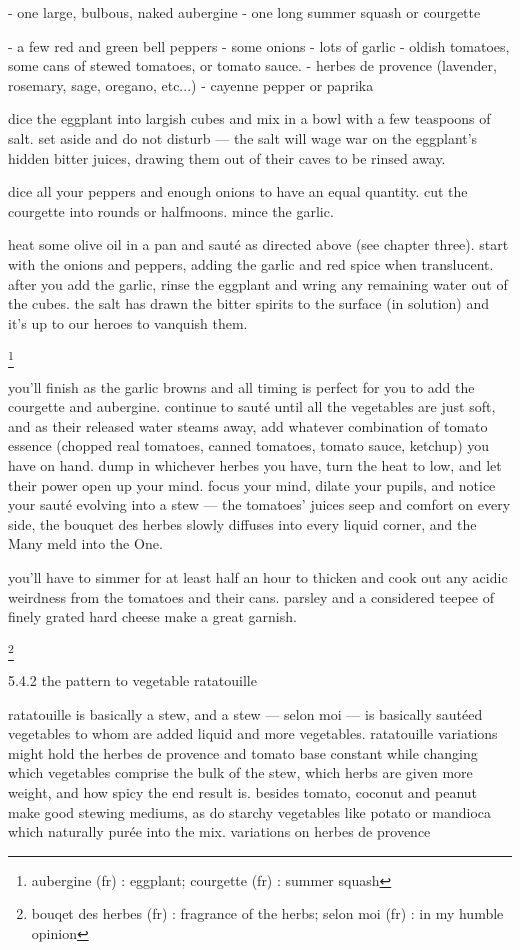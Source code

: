 -	one large, bulbous, naked aubergine
-	one long summer squash or courgette

-	a few red and green bell peppers
-	some onions
-	lots of garlic
-	oldish tomatoes, some cans of stewed tomatoes, or tomato sauce.
-	herbes de provence (lavender, rosemary, sage, oregano, etc...)
-	cayenne pepper or paprika

dice the eggplant into largish cubes and mix in a bowl with a few teaspoons of salt. set aside and do not disturb --- the salt will wage war on the eggplant's hidden bitter juices, drawing them out of their caves to be rinsed away.

dice all your peppers and enough onions to have an equal quantity. cut the courgette into rounds or halfmoons. mince the garlic.

heat some olive oil in a pan and saut\'{e} as directed above (see chapter three). start with the onions and peppers, adding the garlic and red spice when translucent. after you add the garlic, rinse the eggplant and wring any remaining water out of the cubes. the salt has drawn the bitter spirits to the surface (in solution) and it's up to our heroes to vanquish them.

\footnote{aubergine (fr) : eggplant;   courgette (fr) : summer squash}

you'll finish as the garlic browns and all timing is perfect for you to add the courgette and aubergine. continue to saut\'{e} until all the vegetables are just soft, and as their released water steams away, add whatever combination of tomato essence (chopped real tomatoes, canned tomatoes, tomato sauce, ketchup) you have on hand. dump in whichever herbes you have, turn the heat to low, and let their power open up your mind. focus your mind, dilate your pupils, and notice your saut\'{e} evolving into a stew --- the tomatoes' juices seep and comfort on every side, the bouquet des herbes slowly diffuses into every liquid corner, and the Many meld into the One. 

you'll have to simmer for at least half an hour to thicken and cook out any acidic weirdness from the tomatoes and their cans. parsley and a considered teepee of finely grated hard cheese make a great garnish.

\footnote{bouqet des herbes (fr) : fragrance of the herbs;  selon moi (fr) : in my humble opinion}

5.4.2  the pattern to vegetable ratatouille

ratatouille is basically a stew, and a stew --- selon moi --- is basically saut\'{e}ed vegetables to whom are added liquid and more vegetables. ratatouille variations might hold the herbes de provence and tomato base constant while changing which vegetables comprise the bulk of the stew, which herbs are given more weight, and how spicy the end result is. besides tomato, coconut and peanut make good stewing mediums, as do starchy vegetables like potato or mandioca which naturally pur\'{e}e into the mix. 
variations on herbes de provence


